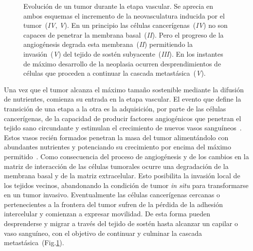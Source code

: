 \begin{figure}[!ht]
\begin{center}
\end{center}\vspace*{-1cm}
\caption[Evoluci\'on de un tumor durante la etapa vascular]{Evoluci\'on de un tumor durante la etapa vascular. Se aprecia en ambos esquemas el incremento de la neovasculatura inducida por el tumor~(\emph{IV}, \emph{V}). En un principio las c\'elulas cancer\'igenas~(\emph{IV}) no son capaces de penetrar la membrana basal~(\emph{II}). Pero el progreso de la angiog\'enesis degrada esta membrana~(\emph{II}) permitiendo la invasi\'on~(\emph{V}) del tejido de sost\'en subyacente~(\emph{III}). En los instantes de m\'aximo desarrollo de la neoplasia ocurren desprendimientos de c\'elulas que proceden a continuar la cascada metast\'asica~(\emph{V}).}
\label{fig-epitelium-3}
\end{figure}

Una vez que el tumor alcanza el m\'aximo tama\~no sostenible mediante la difusi\'on de nutrientes, comienza su entrada en la etapa vascular. El evento que define la transici\'on de una etapa a la otra es la adquisici\'on, por parte de las c\'elulas cancer\'igenas, de la capacidad de producir factores angiog\'enicos que penetran el tejido sano circundante y estimulan el crecimiento de nuevos vasos sangu\'ineos~\cite{robins,vascular}. Estos vasos reci\'en formados penetran la masa del tumor aliment\'andolo con abundantes nutrientes y potenciando su crecimiento por encima del m\'aximo permitido~\cite{vascular,invasion}. Como consecuencia del proceso de angiog\'enesis y de los cambios en la matriz de interacci\'on de las c\'elulas tumorales ocurre una degradaci\'on de la membrana basal y de la matriz extracelular. Esto posibilita la invasi\'on local de los tejidos vecinos, abandonando la condici\'on de tumor \textit{in situ} para transformarse en un tumor invasivo. Eventualmente las c\'elulas cancer\'igenas cercanas o pertenecientes a la frontera del tumor sufren de la p\'erdida de la adhesi\'on intercelular y comienzan a expresar movilidad. De esta forma pueden desprenderse y migrar a trav\'es del tejido de sost\'en hasta alcanzar un capilar o vaso sangu\'ineo, con el objetivo de continuar y culminar la cascada metast\'asica~(Fig.\ref{fig-epitelium-3}).

